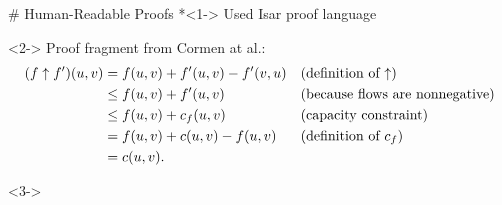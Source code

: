 \documentclass[fleqn]{beamer}
\begin{document}
# Human-Readable Proofs
  *<1-> Used Isar proof language
  
    \begin{uncoverenv}<2->
    {\footnotesize Proof fragment from Cormen at al.:
    \begin{align*}
    (f \uparrow f') (u, v) &= f(u, v) + f'(u, v) - f'(v, u)  && \text{(definition of ${\mathbin\uparrow}$)} \\
    & \leq f(u, v) + f'(u, v) && \text{(because flows are nonnegative)} \\
    & \leq f(u, v) + c_f(u, v) &&  \text{(capacity constraint)} \\
    & = f(u, v) + c(u, v) - f(u, v) && \text{(definition of $c_f$)} \\
    & = c (u, v).
    \end{align*}
    }
    \end{uncoverenv}

    \begin{uncoverenv}<3->
    \end{uncoverenv}
\end{document}
